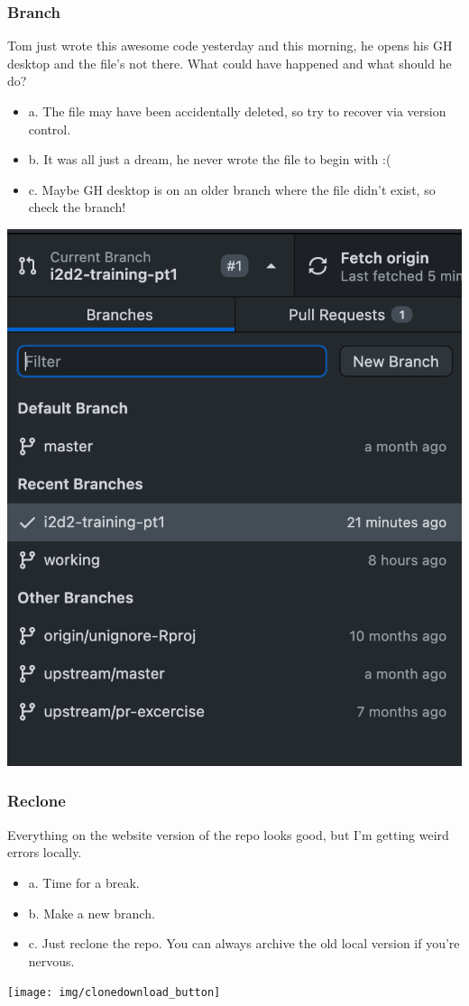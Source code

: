 \documentclass[aspectratio=169]{beamer} %
\begin{document}
\begin{frame}
\frametitle{Branch}

	Tom just wrote this awesome code yesterday and this morning, he opens his GH desktop and the file's
	not there. What could have happened and what should he do?

	\begin{itemize}
		\item a. The file may have been accidentally deleted, so try to recover via version control.
		\item b. It was all just a dream, he never wrote the file to begin with :(
		\item c. Maybe GH desktop is on an older branch where the file didn't exist, so check the branch!
	\end{itemize}

\includegraphics[width=1\linewidth]{img/desktop_branch}

\end{frame}

\begin{frame}
\frametitle{Reclone}

	Everything on the website version of the repo looks good, but I'm getting weird errors locally.

	\begin{itemize}
		\item a. Time for a break.
		\item b. Make a new branch.
		\item c. Just reclone the repo. You can always archive the old local version if you're nervous.
	\end{itemize}

\texttt{[image: img/clonedownload\_button]}

\end{frame}
\end{document}
